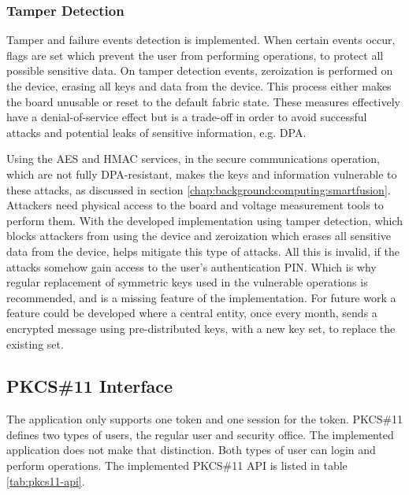 \subsubsection*{Tamper Detection}

Tamper and failure events detection is implemented. When certain events occur, flags are set which prevent the user from performing operations, to protect all possible sensitive data.
On tamper detection events, zeroization is performed on the device, erasing all keys and data from the device. This process either makes the board unusable or reset to the default fabric state.
These measures effectively have a denial-of-service effect but is a trade-off in order to avoid successful attacks and potential leaks of sensitive information, e.g. \ac{DPA}.

Using the AES and HMAC services, in the secure communications operation, which are not fully DPA-resistant, makes the keys and information vulnerable to these attacks, as discussed in section \ref{chap:background:computing:smartfusion}.
Attackers need physical access to the board and voltage measurement tools to perform them.
With the developed implementation using tamper detection, which blocks attackers from using the device and zeroization which erases all sensitive data from the device, helps mitigate this type of attacks.
All this is invalid, if the attacks somehow gain access to the user's authentication PIN.
Which is why regular replacement of symmetric keys used in the vulnerable operations is recommended, and is a missing feature of the implementation.
For future work a feature could be developed where a central entity, once every month, sends a encrypted message using pre-distributed keys, with a new key set, to replace the existing set.


\subsection{PKCS\#11 Interface}\label{chap:implementation:app:interface}

The application only supports one token and one session for the token.
PKCS\#11 defines two types of users, the regular user and security office. The implemented application does not make that distinction. Both types of user can login and perform operations.
The implemented PKCS\#11 API is listed in table \ref{tab:pkcs11-api}.

